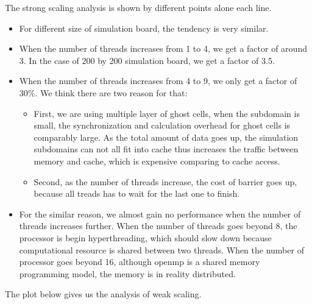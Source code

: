 \documentclass[11pt]{article}
\begin{document}
        \vspace{0.3cm}
        
    	The strong scaling analysis is shown by different points alone each line.
        \begin{itemize}
        	\item For different size of simulation board, the tendency is very similar.
            \item When the number of threads increases from 1 to 4, we get a factor of around 3. In the case of 200 by 200
            simulation board, we get a factor of 3.5.
            \item When the number of threads increases from 4 to 9, we only get a factor of 30\%. We think there are two
            reason for that:
            	\begin{itemize}
				\item First, we are using multiple layer of ghost cells, when the subdomain is small, the synchronization 
                and calculation overhead for ghost cells is comparably large. As the total amount of data goes up, the
                simulation subdomains can not all fit into cache thus increases the traffic between memory and cache, which
                is expensive comparing to cache access.
                \item Second, as the number of threads increase, the cost of barrier goes up, because all treads has to wait
                for the last one to finish.
                \end{itemize}
           	\item For the similar reason, we almost gain no performance when the number of threads increases further. When
            the number of threads goes beyond 8, the processor is begin hyperthreading, which should slow down because
            computational resource is shared between two threads. When the number of processor goes beyond 16, although openmp
            is a shared memory programming model, the memory is in reality distributed.
		\end{itemize}
        
        The plot below gives us the analysis of weak scaling.
        
        \begin{center}
        \end{center}
		
\end{document}
